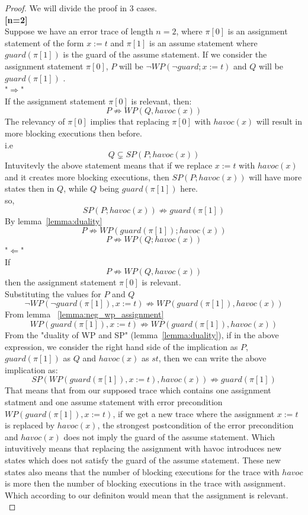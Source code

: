 \documentclass{article}
\newcommand{\limp}{\Rightarrow}
\begin{document}
\begin{proof}
We will divide the proof in 3 cases. \\
\textbf{[n=2]} \\
Suppose we have an error trace of length $n=2$, where $\pi[0]$ is an assignment statement of the form $x:=t$ and $\pi[1]$ is an assume statement where $guard(\pi[1])$ is the guard of the assume statement. If we consider the assignment statement $\pi[0]$, $P$ will be $\neg WP(\neg guard; x:=t)$ and $Q$ will be $guard(\pi[1])$ .\\
"$\Rightarrow$"\\
If the assignment statement $\pi[0]$ is relevant, then: \\
 $$P \not \limp WP(Q,havoc(x))$$
 The relevancy of $\pi[0]$ implies that replacing $\pi[0]$ with $havoc(x)$ will result in more blocking executions then before.\\
 i.e
 $$Q \subsetneq SP(P; havoc(x))$$ 
 Intuvitevly the above statement means that if we replace $x:=t$ with $havoc(x)$ and it creates more blocking executions, then $SP(P; havoc(x))$ will have more states then in $Q$, while $Q$ being $guard(\pi[1])$ here. \\
so,
$$SP(P; havoc(x)) \not \limp guard(\pi[1])$$
By lemma~\ref{lemma:duality} 
$$P \not\limp WP(guard(\pi[1]); havoc(x))$$
$$P \not\limp WP(Q; havoc(x))$$
"$\Leftarrow$"\\
If
$$P \not \limp WP(Q, havoc(x))$$
then the assignment statement $\pi[0]$ is relevant.\\
Substituting the values for $P$ and $Q$
$$\neg WP(\neg guard(\pi[1]), x:=t) \not\limp WP(guard(\pi[1]), havoc(x))$$
From lemma ~\ref{lemma:neg_wp_assignment}
$$WP(guard(\pi[1]), x:=t) \not\limp WP(guard(\pi[1]), havoc(x))$$
From the "duality of WP and SP" (lemma~\ref{lemma:duality}), if in the above expression, we consider the right hand side of the implication as $P$, $guard(\pi[1])$ as $Q$ and $havoc(x)$ as $st$, then we can write the above implication as: \\
$$SP(WP(guard(\pi[1]), x:=t), havoc(x)) \not\limp guard(\pi[1])$$
That means that from our supposed trace which contains one assignment statment and one assume statement with error precondition $WP(guard(\pi[1]),x:=t)$, if we get a new trace where the assignment $x:=t$ is replaced by $havoc(x)$, the strongest postcondition of the error precondition and $havoc(x)$ does not imply the guard of the assume statement. Which intuvitively means that replacing the assignment with havoc introduces new states which does not satisfy the guard of the assume statement. These new states also means that the number of blocking executions for the trace with $havoc$ is more then the number of blocking executions in the trace with assignment. Which according to our definiton would mean that the assignment is relevant.\\
\end{proof}
\end{document}

